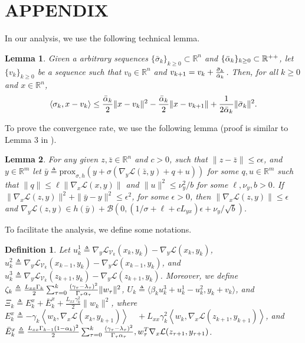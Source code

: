 \documentclass[letterpaper,11 pt]{article}
\newtheorem{lemma}{Lemma}
\newtheorem{definition}{Definition}
\def\ml{\mathcal L}
\newcommand{\zal}[1]{{\color{black}#1}}
\newcommand{\z}[1]{{\color{black}#1}}
\begin{document}
\section*{APPENDIX}
In our analysis, we use the following technical lemma. 
\begin{lemma}\label{lem:error}
Given a arbitrary sequences $\{\bar\sigma_k\}_{k\geq 0}\subset \mathbb R^n$ and $\z{\{\bar\alpha_k\}}_{k\geq 0}\subset \mathbb R^{++}$, let $\{v_k\}_{k\geq0}$ be a sequence such that $v_0\in \mathbb R^n$ and $v_{k+1}=v_k+\z{\tfrac{\bar\sigma_k}{\bar \alpha_k}}$. Then, for all $k\geq 0$ and $x\in \mathbb R^n$,
$$\langle \sigma_k,x-v_k\rangle\leq {\z{\bar \alpha_k}\over 2}\|x-v_k\|^2-{\z{\bar \alpha_k}\over 2}\|x-v_{k+1}\|+{1\over 2 \z{\bar \alpha_k}}\|\bar\sigma_k\|^2.$$
\end{lemma}
To prove the convergence rate, we use the following lemma (proof is similar to Lemma 3 in \cite{ghadimi2016accelerated}).
\begin{lemma}\label{epsilon stationary}
For any given $z,\bar z\in \mathbb R^n$ and $c>0$, such that $\|z-\bar z\|\leq c \epsilon$, and $y\in \mathbb R^m$ let $\bar y\triangleq \mbox{prox}_{\sigma,h}(y+\sigma(\nabla_y\mathcal L(\bar z,y)+q+u))$ for some $q,u\in \mathbb R^m$ such that $\|q\|\leq \ell\|\nabla_x\mathcal L(x,y)\|$ and $\|u\|^2\leq \nu_y^2/b$ for some $\ell,\nu_y,b>0$. If $\|\nabla_x\mathcal L(z,y)\|^2+\|\bar y-y\|^2\leq \epsilon^2$, for some $\epsilon>0$, then $\|\nabla_x\mathcal L(z,y)\|\leq  \epsilon$ and $\nabla_y\mathcal L(z,y)\in h(\bar y)+\mathcal B(0,(1/\sigma+\ell+cL_{yx}) \epsilon+\nu_y/\sqrt b)$.
\end{lemma}
To facilitate the analysis, we define some notations.
\begin{definition}
\label{def}
Let $u_k^1\triangleq\nabla_y\ml_{\mathcal V_k}{(x_{k},y_{k})}-\nabla_y\ml{(x_{k},y_{k})}$, $u_k^2\triangleq\nabla_y\ml_{\mathcal V_k}{(x_{k-1},y_{k})}-\nabla_y\ml{(x_{k-1},y_{k})}$, and $u_k^3\triangleq\nabla_y \ml_{\mathcal V_k}{(z_{k+1},y_{k})}-\nabla_y \ml{(z_{k+1},y_{k})}$. Moreover, we define $\zeta_k\triangleq{L_{xx}\Gamma_{k}\over 2}\sum_{\tau=0}^{k}{(\gamma_\tau-\lambda_\tau)^2\over\Gamma_{\tau}\alpha_{\tau}}\|w_\tau\|^2$, $U_k\triangleq\langle \beta_ku_k^3+u_k^1-u_k^2,y_k+v_k\rangle$, and $\Xi_k\triangleq E_k^x+\bar E_k^x+\tfrac{L_{xx}\gamma_k^2}{2}\|w_k\|^2$, where $E_k^x\triangleq -\gamma_k\left\langle w_k,\nabla_x\ml(x_k,y_{k+1})\right\rangle\quad+L_{xx}\gamma_k^2\left\langle w_k,\nabla_x\ml(z_{k+1},y_{k+1})\right\rangle$, and $\bar E_k^x\triangleq \tfrac{L_{xx}\Gamma_{\zal{k-1}}(1-\alpha_k)^2}{ 2}\sum_{\tau=0}^{k}\tfrac{(\gamma_\tau-\lambda_\tau)^2}{\Gamma_{\tau}\alpha_{\tau}}, w_\tau^T\nabla_x\ml(z_{\tau+1},y_{\tau+1})$.
\end{definition}
\end{document}
